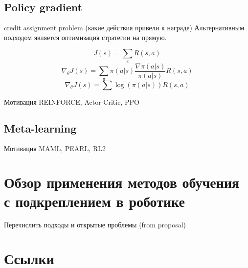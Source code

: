 \subsection{Policy gradient}
credit assignment problem (какие действия привели к награде)
Альтернативным подходом является оптимизация стратегии на прямую. 

$$J(s) = \sum_{\pi} R(s,a )$$
$$\nabla_{\theta} J(s) = \sum_{\pi} \pi(a|s)\frac{\nabla \pi(a|s)}{\pi(a|s)}R(s,a )$$
$$\nabla_{\theta} J(s) = \sum \log(\pi(a|s))R(s,a )$$

Мотивация 
REINFORCE, Actor-Critic, PPO

\subsection{Meta-learning}
Мотивация MAML, PEARL, RL2

\section{Обзор применения методов обучения с подкреплением в роботике}\label{sec:ch1/sec2}
Перечислить подходы и открытые проблемы (from proposal)


\section{Ссылки}\label{sec:ch1/sec2}


\FloatBarrier
